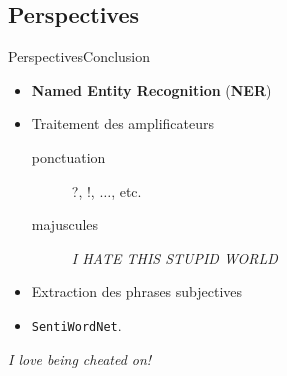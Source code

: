 \documentclass[usenames,dvipsnames]{beamer}
\begin{document}
\subsection{Perspectives}
\begin{frame}{Perspectives}{Conclusion}
\begin{itemize}
    \item \textbf{Named Entity Recognition} (\textbf{NER})
    \item Traitement des amplificateurs
    \begin{description}
      \item [ponctuation] ?, !, $\dots$, etc.
      \item [majuscules] \textit{I HATE THIS STUPID WORLD}
    \end{description}
    \item Extraction des phrases subjectives
    \item \texttt{SentiWordNet}.
\end{itemize}

\begin{example}
    \textit{I love being cheated on!}
\end{example}
\end{frame}
\end{document}
